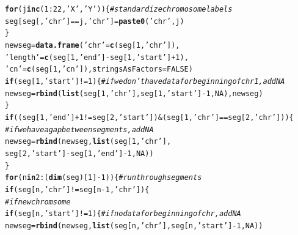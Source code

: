 \documentclass[12pt]{article}\usepackage[]{graphicx}\usepackage[]{color}
\makeatletter
\newcommand{\hlnum}[1]{\textcolor[rgb]{0.686,0.059,0.569}{#1}}%
\newcommand{\hlstr}[1]{\textcolor[rgb]{0.192,0.494,0.8}{#1}}%
\newcommand{\hlcom}[1]{\textcolor[rgb]{0.678,0.584,0.686}{\textit{#1}}}%
\newcommand{\hlopt}[1]{\textcolor[rgb]{0,0,0}{#1}}%
\newcommand{\hlstd}[1]{\textcolor[rgb]{0.345,0.345,0.345}{#1}}%
\newcommand{\hlkwa}[1]{\textcolor[rgb]{0.161,0.373,0.58}{\textbf{#1}}}%
\newcommand{\hlkwb}[1]{\textcolor[rgb]{0.69,0.353,0.396}{#1}}%
\newcommand{\hlkwc}[1]{\textcolor[rgb]{0.333,0.667,0.333}{#1}}%
\newcommand{\hlkwd}[1]{\textcolor[rgb]{0.737,0.353,0.396}{\textbf{#1}}}%
\newenvironment{kframe}{%
 \def\at@end@of@kframe{}%
 \ifinner\ifhmode%
  \def\at@end@of@kframe{\end{minipage}}%
  \begin{minipage}{\columnwidth}%
 \fi\fi%
 \def\FrameCommand##1{\hskip\@totalleftmargin \hskip-\fboxsep
 \colorbox{shadecolor}{##1}\hskip-\fboxsep
     \hskip-\linewidth \hskip-\@totalleftmargin \hskip\columnwidth}%
 \MakeFramed {\advance\hsize-\width
   \@totalleftmargin\z@ \linewidth\hsize
   \@setminipage}}%
 {\par\unskip\endMakeFramed%
 \at@end@of@kframe}
\newenvironment{knitrout}{}{} %
\makeatother
\begin{document}
\begin{knitrout}
\begin{kframe}
\begin{alltt}
    \hlkwa{for} \hlstd{(j} \hlkwa{in} \hlkwd{c}\hlstd{(}\hlnum{1}\hlopt{:}\hlnum{22}\hlstd{,}\hlstr{'X'}\hlstd{,}\hlstr{'Y'}\hlstd{))\{} \hlcom{#standardize chromosome labels}
      \hlstd{seg[seg[,}\hlstr{'chr'}\hlstd{]} \hlopt{==} \hlstd{j,} \hlstr{'chr'}\hlstd{]} \hlkwb{=} \hlkwd{paste0}\hlstd{(}\hlstr{'chr'}\hlstd{,j)}
    \hlstd{\}}
    \hlstd{newseg} \hlkwb{=} \hlkwd{data.frame}\hlstd{(}\hlstr{'chr'} \hlstd{=} \hlkwd{c}\hlstd{(seg[}\hlnum{1}\hlstd{,}\hlstr{'chr'}\hlstd{]),}
                        \hlstr{'length'} \hlstd{=} \hlkwd{c}\hlstd{(seg[}\hlnum{1}\hlstd{,}\hlstr{'end'}\hlstd{]} \hlopt{-} \hlstd{seg[}\hlnum{1}\hlstd{,}\hlstr{'start'}\hlstd{]}\hlopt{+}\hlnum{1}\hlstd{),}
                        \hlstr{'cn'} \hlstd{=} \hlkwd{c}\hlstd{(seg[}\hlnum{1}\hlstd{,}\hlstr{'cn'}\hlstd{]),} \hlkwc{stringsAsFactors} \hlstd{=} \hlnum{FALSE}\hlstd{)}
    \hlkwa{if} \hlstd{(seg[}\hlnum{1}\hlstd{,}\hlstr{'start'}\hlstd{]} \hlopt{!=} \hlnum{1}\hlstd{)\{} \hlcom{#if we don't have data for beginning of chr1, add NA}
      \hlstd{newseg} \hlkwb{=} \hlkwd{rbind}\hlstd{(}\hlkwd{list}\hlstd{(seg[}\hlnum{1}\hlstd{,}\hlstr{'chr'}\hlstd{], seg[}\hlnum{1}\hlstd{,}\hlstr{'start'}\hlstd{]}\hlopt{-}\hlnum{1}\hlstd{,}  \hlnum{NA}\hlstd{), newseg)}
    \hlstd{\}}
    \hlkwa{if} \hlstd{((seg[}\hlnum{1}\hlstd{,}\hlstr{'end'}\hlstd{]}\hlopt{+}\hlnum{1} \hlopt{!=} \hlstd{seg[}\hlnum{2}\hlstd{,}\hlstr{'start'}\hlstd{])} \hlopt{&} \hlstd{(seg[}\hlnum{1}\hlstd{,} \hlstr{'chr'}\hlstd{]} \hlopt{==} \hlstd{seg[}\hlnum{2}\hlstd{,} \hlstr{'chr'}\hlstd{]))\{}
      \hlcom{#if we have a gap between segments, add NA}
      \hlstd{newseg} \hlkwb{=} \hlkwd{rbind}\hlstd{(newseg,} \hlkwd{list}\hlstd{(seg[}\hlnum{1}\hlstd{,}\hlstr{'chr'}\hlstd{],}
                                  \hlstd{seg[}\hlnum{2}\hlstd{,}\hlstr{'start'}\hlstd{]} \hlopt{-} \hlstd{seg[}\hlnum{1}\hlstd{,}\hlstr{'end'}\hlstd{]}\hlopt{-}\hlnum{1}\hlstd{,}  \hlnum{NA}\hlstd{))}
    \hlstd{\}}
    \hlkwa{for} \hlstd{(n} \hlkwa{in} \hlnum{2}\hlopt{:}\hlstd{(}\hlkwd{dim}\hlstd{(seg)[}\hlnum{1}\hlstd{]}\hlopt{-}\hlnum{1}\hlstd{))\{} \hlcom{#run through segments}
      \hlkwa{if} \hlstd{(seg[n,} \hlstr{'chr'}\hlstd{]} \hlopt{!=} \hlstd{seg[n}\hlopt{-}\hlnum{1}\hlstd{,} \hlstr{'chr'}\hlstd{])\{}
        \hlcom{#if new chromsome}
        \hlkwa{if} \hlstd{(seg[n,}\hlstr{'start'}\hlstd{]} \hlopt{!=} \hlnum{1}\hlstd{)\{} \hlcom{#if no data for beginning of chr, add NA}
          \hlstd{newseg} \hlkwb{=} \hlkwd{rbind}\hlstd{(newseg,} \hlkwd{list}\hlstd{(seg[n,}\hlstr{'chr'}\hlstd{], seg[n,}\hlstr{'start'}\hlstd{]}\hlopt{-}\hlnum{1}\hlstd{,}  \hlnum{NA}\hlstd{))}

\end{alltt}
\end{kframe}
\end{knitrout}
\end{document}
